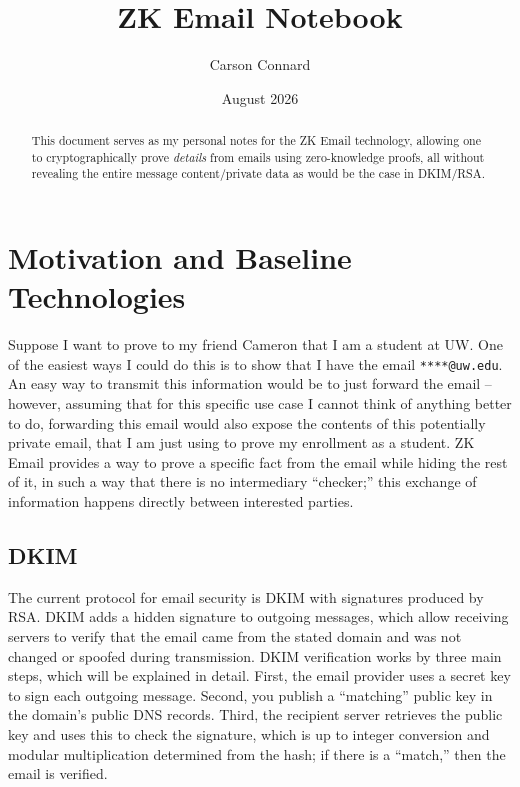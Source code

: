 \documentclass[12pt,reqno]{amsart}
\title{ZK Email Notebook}
\author{Carson Connard}
\date{August 2026}
\theoremstyle{definition}
\begin{document}
\setcounter{tocdepth}{1}
\maketitle



\begin{abstract}
    This document serves as my personal notes for the ZK Email technology, allowing one to cryptographically prove \textit{details} from emails using zero-knowledge proofs, all without revealing the entire message content/private data as would be the case in DKIM/RSA. 
\end{abstract}

\section{Motivation and Baseline Technologies}

Suppose I want to prove to my friend Cameron that I am a student at UW. One of the easiest ways I could do this is to show that I have the email \verb|****@uw.edu|. An easy way to transmit this information would be to just forward the email -- however, assuming that for this specific use case I cannot think of anything better to do, forwarding this email would also expose the contents of this potentially private email, that I am just using to prove my enrollment as a student. ZK Email provides a way to prove a specific fact from the email while hiding the rest of it, in such a way that there is no intermediary ``checker;'' this exchange of information happens directly between interested parties.

\subsection{DKIM} The current protocol for email security is DKIM with signatures produced by RSA. DKIM adds a hidden signature to outgoing messages, which allow receiving servers to verify that the email came from the stated domain and was not changed or spoofed during transmission. DKIM verification works by three main steps, which will be explained in detail. First, the email provider uses a secret key to sign each outgoing message. Second, you publish a ``matching'' public key in the domain's public DNS records. Third, the recipient server retrieves the public key and uses this to check the signature, which is up to integer conversion and modular multiplication determined from the hash; if there is a ``match,'' then the email is verified. 
\end{document}
